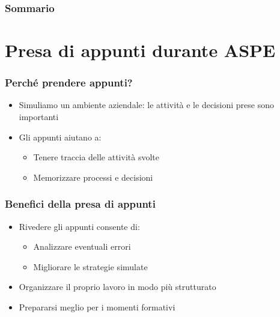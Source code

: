 \documentclass{beamer}
\title[\sottotitoloSmall]{\titolo}
\subtitle{\sottotitolo}
\author[\docente]{\docente\\\email}
\institute[\istitutoSmall]{\istituto\\\materia\\\classe}
\date{}
\begin{document}
\begin{frame}
\maketitle
\thispagestyle{empty}
\end{frame}

\begin{frame}
  \frametitle{Sommario}
  \tableofcontents
\end{frame}

\section{Presa di appunti durante ASPE}
\begin{frame}
  \frametitle{Perché prendere appunti?}

  \begin{itemize}
    \item Simuliamo un ambiente aziendale: le attività e le decisioni prese sono importanti
    \item Gli appunti aiutano a:
      \begin{itemize}
        \item Tenere traccia delle attività svolte
        \item Memorizzare processi e decisioni
      \end{itemize}
  \end{itemize}
\end{frame}

\begin{frame}
  \frametitle{Benefici della presa di appunti}

  \begin{itemize}
    \item Rivedere gli appunti consente di:
      \begin{itemize}
        \item Analizzare eventuali errori
        \item Migliorare le strategie simulate
      \end{itemize}
    \item Organizzare il proprio lavoro in modo più strutturato
    \item Prepararsi meglio per i momenti formativi
  \end{itemize}
\end{frame}
\end{document}
